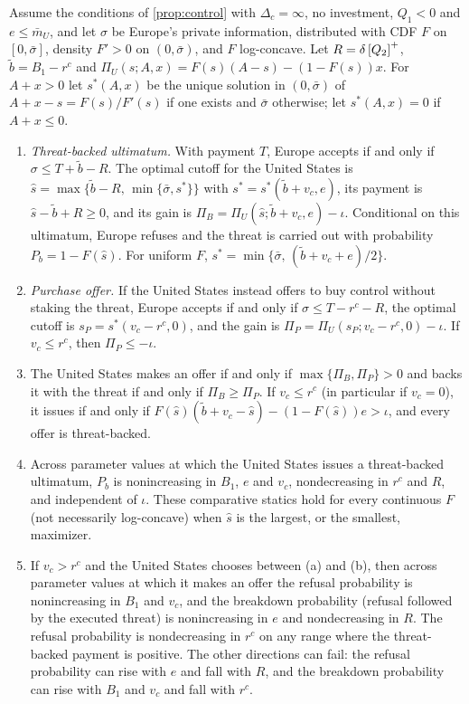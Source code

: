 \begin{proposition}[Breakdown]\label{prop:breakdown}
Assume the conditions of \cref{prop:control} with $\Delta_c=\infty$, no investment, $Q_1<0$ and $e\le\bar m_U$, and let $\sigma$ be Europe's private information, distributed with CDF $F$ on $[0,\bar\sigma]$, density $F'>0$ on $(0,\bar\sigma)$, and $F$ log-concave. Let $R=\delta\left[Q_2\right]^{+}$, $\tilde b=B_1-r^c$ and $\Pi_U(s;A,x)=F(s)(A-s)-(1-F(s))x$. For $A+x>0$ let $s^*(A,x)$ be the unique solution in $(0,\bar\sigma)$ of $A+x-s=F(s)/F'(s)$ if one exists and $\bar\sigma$ otherwise; let $s^*(A,x)=0$ if $A+x\le 0$.
\begin{enumerate}[label=(\alph*)]
\item \emph{Threat-backed ultimatum.} With payment $T$, Europe accepts if and only if $\sigma\le T+\tilde b-R$. The optimal cutoff for the United States is $\hat s=\max\{\tilde b-R,\,\min\{\bar\sigma,s^*\}\}$ with $s^*=s^*(\tilde b+v_c,e)$, its payment is $\hat s-\tilde b+R\ge 0$, and its gain is $\Pi_B=\Pi_U(\hat s;\tilde b+v_c,e)-\iota$. Conditional on this ultimatum, Europe refuses and the threat is carried out with probability $P_b=1-F(\hat s)$. For uniform $F$, $s^*=\min\{\bar\sigma,\,(\tilde b+v_c+e)/2\}$.
\item \emph{Purchase offer.} If the United States instead offers to buy control without staking the threat, Europe accepts if and only if $\sigma\le T-r^c-R$, the optimal cutoff is $s_P=s^*(v_c-r^c,0)$, and the gain is $\Pi_P=\Pi_U(s_P;v_c-r^c,0)-\iota$. If $v_c\le r^c$, then $\Pi_P\le -\iota$.
\item The United States makes an offer if and only if $\max\{\Pi_B,\Pi_P\}>0$ and backs it with the threat if and only if $\Pi_B\ge\Pi_P$. If $v_c\le r^c$ (in particular if $v_c=0$), it issues if and only if $F(\hat s)(\tilde b+v_c-\hat s)-(1-F(\hat s))e>\iota$, and every offer is threat-backed.
\item Across parameter values at which the United States issues a threat-backed ultimatum, $P_b$ is nonincreasing in $B_1$, $e$ and $v_c$, nondecreasing in $r^c$ and $R$, and independent of $\iota$. These comparative statics hold for every continuous $F$ (not necessarily log-concave) when $\hat s$ is the largest, or the smallest, maximizer.
\item If $v_c>r^c$ and the United States chooses between (a) and (b), then across parameter values at which it makes an offer the refusal probability is nonincreasing in $B_1$ and $v_c$, and the breakdown probability (refusal followed by the executed threat) is nonincreasing in $e$ and nondecreasing in $R$. The refusal probability is nondecreasing in $r^c$ on any range where the threat-backed payment is positive. The other directions can fail: the refusal probability can rise with $e$ and fall with $R$, and the breakdown probability can rise with $B_1$ and $v_c$ and fall with $r^c$.
\end{enumerate}
\end{proposition}

